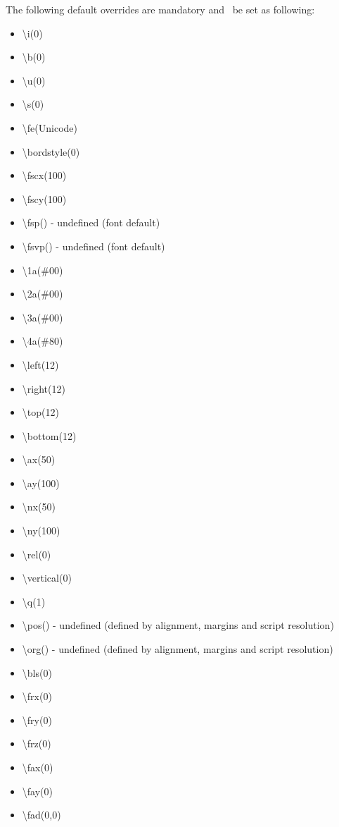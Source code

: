 \documentclass{spec}
\begin{document}
The following default overrides are mandatory and \must\ be set as following:
\begin{itemize}
\item \textbackslash i(0)
\item \textbackslash b(0)
\item \textbackslash u(0)
\item \textbackslash s(0)
\item \textbackslash fe(Unicode)
\item \textbackslash bordstyle(0)
\item \textbackslash fscx(100)
\item \textbackslash fscy(100)
\item \textbackslash fsp() - undefined (font default)
\item \textbackslash fsvp() - undefined (font default)
\item \textbackslash 1a(\#00)
\item \textbackslash 2a(\#00)
\item \textbackslash 3a(\#00)
\item \textbackslash 4a(\#80)
\item \textbackslash left(12)
\item \textbackslash right(12)
\item \textbackslash top(12)
\item \textbackslash bottom(12)
\item \textbackslash ax(50)
\item \textbackslash ay(100)
\item \textbackslash nx(50)
\item \textbackslash ny(100)
\item \textbackslash rel(0)
\item \textbackslash vertical(0)
\item \textbackslash q(1)
\item \textbackslash pos() - undefined (defined by alignment, margins and script resolution)
\item \textbackslash org() - undefined (defined by alignment, margins and script resolution)
\item \textbackslash bls(0)
\item \textbackslash frx(0)
\item \textbackslash fry(0)
\item \textbackslash frz(0)
\item \textbackslash fax(0)
\item \textbackslash fay(0)
\item \textbackslash fad(0,0)

\end{itemize}
\end{document}
